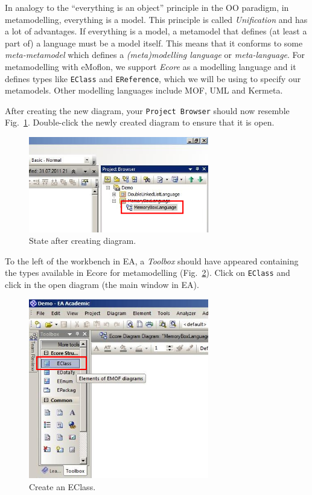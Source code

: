 In analogy to the ``everything is an object''
principle in the OO paradigm, in metamodelling, everything is a model.
This principle is called \emph{Unification} and has a lot of advantages.
If everything is a model, a metamodel that defines (at least a part of) a
language must be a model itself.
This means that it conforms to some \emph{meta-metamodel} which defines a
\emph{(meta)modelling language} or \emph{meta-language}.
For metamodelling with eMoflon, we support \emph{Ecore} as a modelling language
and it defines types like \texttt{EClass} and \texttt{EReference}, which we will
be using to specify  our metamodels.
Other modelling languages include MOF, UML and Kermeta. 

\clearpage

After creating the new diagram, your  \texttt{Project Browser} should now
resemble Fig.~\ref{fig:diagram_completed}.  Double-click the newly
created diagram to ensure that it is open.

\begin{figure}[htbp]
	\centering
  \includegraphics[width=0.7\textwidth]{pics/memBoxBilder/memBox06.png}
	\caption{State after creating diagram.}
	\label{fig:diagram_completed}
\end{figure}

To the left of the workbench in EA, a \emph{Toolbox} should have appeared
containing the types available in Ecore for metamodelling
(Fig.~\ref{fig:eclass}).  Click on \texttt{EClass} and click in the open
diagram (the main window in EA).

\begin{figure}[htbp]
	\centering
  \includegraphics[width=0.7\textwidth]{pics/memBoxBilder/memBox07.png}
	\caption{Create an EClass.}
	\label{fig:eclass}
\end{figure}

